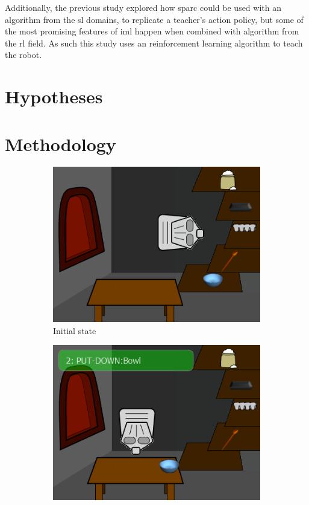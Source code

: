 Additionally, the previous study explored how \gls{sparc} could be used with an algorithm from the \gls{sl} domains, to replicate a teacher's action policy, but some of the most promising features of \gls{iml} happen when combined with algorithm from the \gls{rl} field. As such this study uses an reinforcement learning algorithm to teach the robot.

\section{Hypotheses}

\section{Methodology}

\begin{figure}[ht]
	\centering
	\begin{subfigure}[b]{0.3\textwidth}
		\centering
		\includegraphics[width=\textwidth]{step0.png}
		\caption{Initial state}
		\label{img:initial}
	\end{subfigure}
	\centering
	\begin{subfigure}[b]{0.3\textwidth}
		\centering
		\includegraphics[width=\textwidth]{step1.png}

\end{subfigure}
\end{figure}
